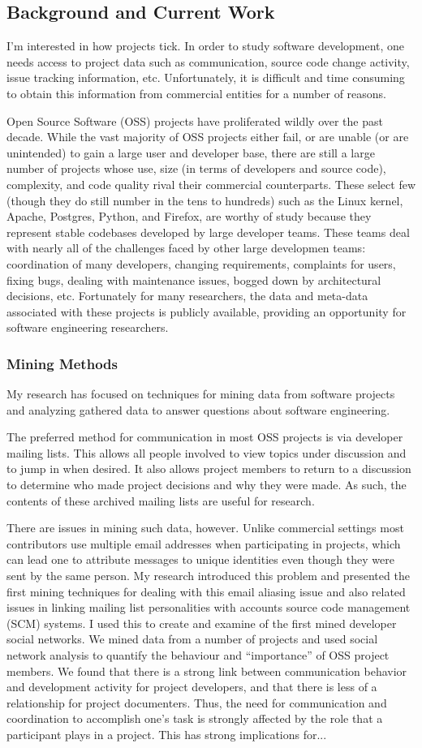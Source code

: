 \documentclass[10pt]{article}
\newcommand\Section[1]{\section*{#1}}
\newcommand\Subsection[1]{\subsubsection*{#1}}
\begin{document}
\begin{small}
\Section{Background and Current Work}

I'm interested in how projects tick.  In order to study software development,
one needs access to project data such as communication, source code change
activity, issue tracking information, etc.  Unfortunately, it is difficult 
and time consuming to obtain this information from commercial entities for
a number of reasons.

Open Source Software (OSS) projects have proliferated wildly over the past
decade.  While the vast majority of OSS projects either fail, or are unable (or
are unintended) to gain a large user and developer base, there are still a
large number of projects whose use, size (in terms of developers and source
code), complexity, and code quality rival their commercial counterparts.  These
select few (though they do still number in the tens to hundreds) such as the
Linux kernel, Apache, Postgres, Python, and Firefox, are worthy of study
because they represent stable codebases developed by large developer teams.
These teams deal with nearly all of the challenges faced by other large
developmen teams: coordination of many developers, changing requirements,
complaints for users, fixing bugs, dealing with maintenance issues, bogged down
by architectural decisions, etc.  Fortunately for many researchers, the data and
meta-data associated with these projects is publicly available, providing
an opportunity for software engineering researchers.

\Subsection{Mining Methods}

My research has focused on techniques for mining data from software projects
and analyzing gathered data to answer questions about software engineering.

The preferred method for communication in most OSS projects is via
developer mailing lists.  This allows all people involved to view
topics under discussion and to jump in when desired.  It also allows
project members to return to a discussion to determine who made project
decisions and why they were made.  As such, the contents of these archived
mailing lists are useful for research.

There are issues in mining such data, however.  Unlike commercial settings most
contributors use multiple email addresses when participating in projects, which
can lead one to attribute messages to unique identities even though they were
sent by the same person.  My research introduced this problem and presented the
first mining techniques for dealing with this email aliasing issue and also
related issues in linking mailing list personalities with accounts source code
management (SCM) systems.  I used this to create and examine of the
first mined developer social networks.  
We mined data from a number of projects and used social network analysis
to quantify the behaviour and ``importance'' of OSS project members.
We found that there is a strong link between communication behavior and
development activity for project developers, and that there is less of a
relationship for project documenters.  Thus, the need for communication and
coordination to accomplish one's task is strongly affected by the role that a
participant plays in a project.  This has strong implications for...


\end{small}
\end{document}
